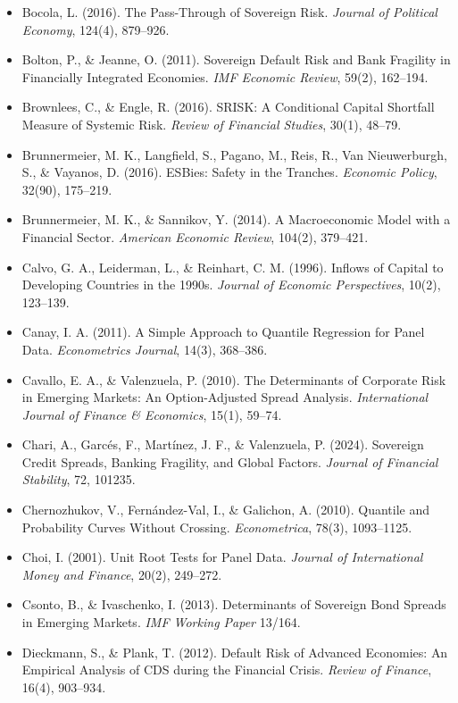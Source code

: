 \documentclass[5p,times,twocolumn,authoryear]{elsarticle}
\begin{document}
\begin{itemize}
    \item Bocola, L. (2016). The Pass-Through of Sovereign Risk. \textit{Journal of Political Economy}, 124(4), 879–926.
    \item Bolton, P., \& Jeanne, O. (2011). Sovereign Default Risk and Bank Fragility in Financially Integrated Economies. \textit{IMF Economic Review}, 59(2), 162–194.
    \item Brownlees, C., \& Engle, R. (2016). SRISK: A Conditional Capital Shortfall Measure of Systemic Risk. \textit{Review of Financial Studies}, 30(1), 48–79.
    \item Brunnermeier, M. K., Langfield, S., Pagano, M., Reis, R., Van Nieuwerburgh, S., \& Vayanos, D. (2016). ESBies: Safety in the Tranches. \textit{Economic Policy}, 32(90), 175–219.
    \item Brunnermeier, M. K., \& Sannikov, Y. (2014). A Macroeconomic Model with a Financial Sector. \textit{American Economic Review}, 104(2), 379–421.
    \item Calvo, G. A., Leiderman, L., \& Reinhart, C. M. (1996). Inflows of Capital to Developing Countries in the 1990s. \textit{Journal of Economic Perspectives}, 10(2), 123–139.
    \item Canay, I. A. (2011). A Simple Approach to Quantile Regression for Panel Data. \textit{Econometrics Journal}, 14(3), 368–386.
    \item Cavallo, E. A., \& Valenzuela, P. (2010). The Determinants of Corporate Risk in Emerging Markets: An Option-Adjusted Spread Analysis. \textit{International Journal of Finance \& Economics}, 15(1), 59–74.
    \item Chari, A., Garcés, F., Martínez, J. F., \& Valenzuela, P. (2024). Sovereign Credit Spreads, Banking Fragility, and Global Factors. \textit{Journal of Financial Stability}, 72, 101235.
    \item Chernozhukov, V., Fernández-Val, I., \& Galichon, A. (2010). Quantile and Probability Curves Without Crossing. \textit{Econometrica}, 78(3), 1093–1125.
    \item Choi, I. (2001). Unit Root Tests for Panel Data. \textit{Journal of International Money and Finance}, 20(2), 249–272.
    \item Csonto, B., \& Ivaschenko, I. (2013). Determinants of Sovereign Bond Spreads in Emerging Markets. \textit{IMF Working Paper} 13/164.
    \item Dieckmann, S., \& Plank, T. (2012). Default Risk of Advanced Economies: An Empirical Analysis of CDS during the Financial Crisis. \textit{Review of Finance}, 16(4), 903–934.

\end{itemize}
\end{document}
